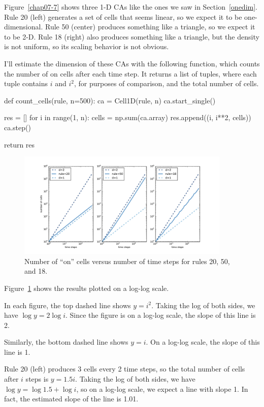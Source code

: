 \documentclass[12pt]{book}
\theoremstyle{exercise}
\begin{document}
Figure~\ref{chap07-7} shows three 1-D CAs like the ones we saw
in Section~\ref{onedim}.  Rule 20 (left) generates
a set of cells that seems linear, so we expect it to be one-dimensional.  Rule 50 (center) produces something like a triangle, so
we expect it to be 2-D.  Rule 18 (right) also produces something like a
triangle, but the density is not uniform, so its scaling behavior is
not obvious.

I'll estimate the dimension of these CAs with the following function,
which counts the number of on cells after each time step.
It returns a list of tuples, where each tuple contains $i$ and
$i^2$, for purposes of comparison, and the total number of cells.

\begin{code}
def count_cells(rule, n=500):
    ca = Cell1D(rule, n)
    ca.start_single()
    
    res = []
    for i in range(1, n):
        cells = np.sum(ca.array)
        res.append((i, i**2, cells))
        ca.step()
        
    return res
\end{code}

\begin{figure}
\centerline{\includegraphics[height=2in]{figs/chap07-8.pdf}}
\caption{Number of ``on'' cells versus number of time steps for
rules 20, 50, and 18.}
\label{chap07-8}
\end{figure}

Figure~\ref{chap07-8} shows the results plotted on a log-log scale.

In each figure, the top dashed line shows $y = i^2$.  Taking
the log of both sides, we have $\log y = 2 \log i$.  Since the
figure is on a log-log scale, the slope of this line is 2.

Similarly, the bottom dashed line shows $y = i$.  On a log-log
scale, the slope of this line is 1.

Rule 20 (left) produces 3 cells every 2 time steps, so the total number
of cells after $i$ steps is $y = 1.5 i$.  Taking the log of both
sides, we have $\log y = \log 1.5 + \log i$, so on a log-log
scale, we expect a line with slope 1.  In fact, the estimated
slope of the line is 1.01.
\end{document}
